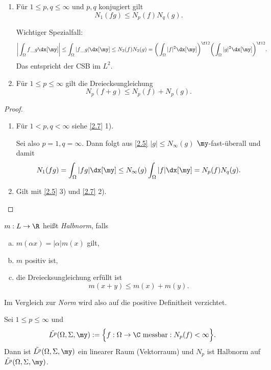 \begin{kor} \label{2.8}
	\begin{enumerate}[1)]
		\item
			Für $1 \le p,q \le \infty$ und $p,q$ konjugiert gilt
			\[
				N_1(fg) \le N_p(f) N_q(g).
			\]
			\begin{note}
				Wichtiger Spezialfall:
				\begin{align*}
					\bigg| \int_{\Omega} f \_g \dx[\my] \bigg|
					&\le \int_{\Omega} |f \_g| \dx[\my]
					\le N_2(f) N_2(g)
					= \bigg( \int_{\Omega} |f|^2 \dx[\my] \bigg)^{\f 12} \bigg( \int_{\Omega} |g|^2 \dx[\my] \bigg)^{\f 12}.
				\end{align*}
				Das entspricht der CSB im $L^2$.
			\end{note}
		\item
			Für $1 \le p \le \infty$ gilt die Dreiecksungleichung
			\[
				N_p(f+g) \le N_p(f) + N_p(g).
			\]
	\end{enumerate}
	\begin{proof}
		\begin{enumerate}[1)]
			\item
				Für $1 < p,q < \infty$ siehe \ref{2.7} 1).

				Sei also $p=1, q = \infty$.
				Dann folgt aus \ref{2.5} $|g| \le N_\infty(g)$ $\my$-fast-überall und damit
				\[
					N_1(fg)
					= \int_{\Omega} |fg| \dx[\my]
					\le N_\infty(g) \int_{\Omega}|f| \dx[\my]
					= N_p(f) N_q(g).
				\]
			\item
				Gilt mit \ref{2.5} 3) und \ref{2.7} 2).
		\end{enumerate}
	\end{proof}
\end{kor}

\begin{df*}
	$m : L \to \R$ heißt \emph{Halbnorm}, falls
	\begin{enumerate}[a)]
		\item
			$\displaystyle m(\alpha x) = |\alpha| m(x)$ gilt,
		\item
			$m$ positiv ist,
		\item
			die Dreiecksungleichung erfüllt ist
			\[
				m(x+y) \le m(x) + m(y).
			\]
	\end{enumerate}
	\begin{note}
		Im Vergleich zur \emph{Norm} wird also auf die positive Definitheit verzichtet.
	\end{note}
\end{df*}

\begin{df} \label{2.9}
	Sei $1 \le p \le \infty$ und
	\[
		\tilde {L^p} (\Omega, \Sigma, \my)
		:= \Big\{ f : \Omega \to \C \text{ messbar} : N_p(f) < \infty \Big\}.
	\]
	Dann ist $\tilde{L^p}(\Omega, \Sigma, \my)$ ein linearer Raum (Vektorraum) und $N_p$ ist Halbnorm auf $\tilde{L^p}(\Omega, \Sigma, \my)$.
\end{df}

